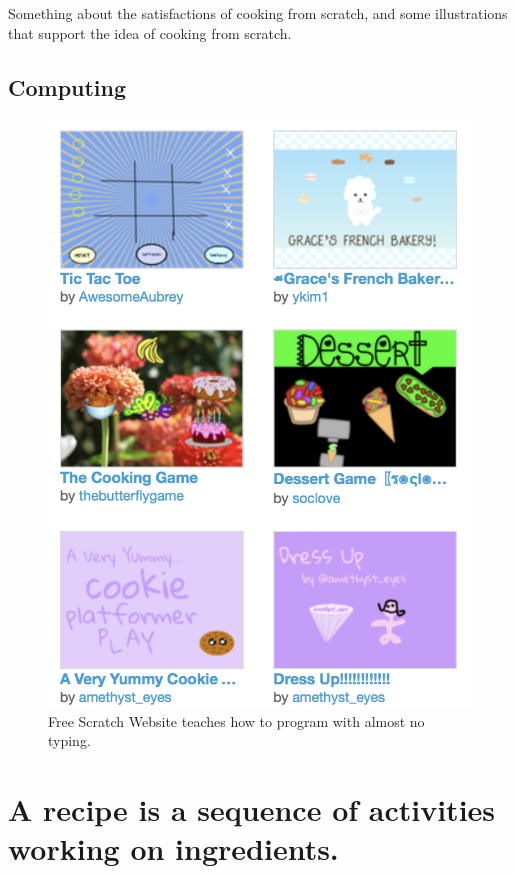\documentclass[]{report}
\begin{document}
Something about the satisfactions of cooking from scratch, and some illustrations that support the idea of cooking from scratch.

\section{Computing}
\begin{figure}
	\centering
	\includegraphics[width=0.7\linewidth]{someProjects}
	\caption{Free Scratch Website teaches how to program with almost no typing.}
	\label{fig:someprojects}
\end{figure}


\chapter{A recipe is a sequence of activities working on ingredients.}
\end{document}
